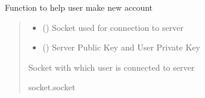 \documentclass[letterpaper,10pt,english]{sphinxmanual}
\begin{document}

\begin{fulllineitems}
\label{\detokenize{app:app.signup}}
\pysigstartsignatures
{}
\pysigstopsignatures
\sphinxAtStartPar
Function to help user make new account
\begin{quote}\begin{description}
\begin{itemize}
\item {} 
\sphinxAtStartPar
{} () \textendash{} Socket used for connection to server

\item {} 
\sphinxAtStartPar
{} () \textendash{} Server Public Key and User Private Key

\end{itemize}

\sphinxAtStartPar
Socket with which user is connected to server

\sphinxAtStartPar
socket.socket

\end{description}\end{quote}

\end{fulllineitems}

\end{document}
